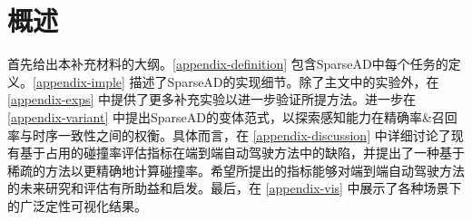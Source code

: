 \section{概述}
\label{appendix-overview}
首先给出本补充材料的大纲。\cref{appendix-definition} 包含SparseAD中每个任务的定义。\cref{appendix-imple} 描述了SparseAD的实现细节。除了主文中的实验外，在 \cref{appendix-exps} 中提供了更多补充实验以进一步验证所提方法。进一步在 \cref{appendix-variant} 中提出SparseAD的变体范式，以探索感知能力在精确率\&召回率与时序一致性之间的权衡。具体而言，在 \cref{appendix-discussion} 中详细讨论了现有基于占用的碰撞率评估指标在端到端自动驾驶方法中的缺陷，并提出了一种基于稀疏的方法以更精确地计算碰撞率。希望所提出的指标能够对端到端自动驾驶方法的未来研究和评估有所助益和启发。最后，在 \cref{appendix-vis} 中展示了各种场景下的广泛定性可视化结果。
